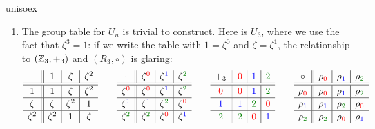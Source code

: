 \begin{examples}{}{unisoex}
\begin{enumerate}
  
  \item\label{ex:unisoex2} The group table for $U_n$ is trivial to construct. Here is $U_3$, where we use the fact that $\zeta^3=1$: if we write the table with $1=\zeta^0$ and $\zeta=\zeta^1$, the relationship to $(\mathbb{Z}_3,+_3)$ and $(R_3,\circ)$ is glaring:
\[\def\arraystretch{1.1}
\begin{array}{c||c|c|c}
\cdot&1&\zeta&\zeta^2\\\hline\hline
1&1&\zeta&\zeta^2\\\hline
\zeta&\zeta&\zeta^2&1\\\hline
\zeta^2&\zeta^2&1&\zeta
\end{array}
\qquad
\begin{array}{c||c|c|c}
\cdot&\zeta^{\textcolor{red}{0}}&\zeta^{\textcolor{blue}{1}}&\zeta^{\textcolor{Green}{2}}\\\hline\hline
\zeta^{\textcolor{red}{0}}&\zeta^{\textcolor{red}{0}}&\zeta^{\textcolor{blue}{1}}&\zeta^{\textcolor{Green}{2}}\\\hline
\zeta^{\textcolor{blue}{1}}&\zeta^{\textcolor{blue}{1}}&\zeta^{\textcolor{Green}{2}}&\zeta^{\textcolor{red}{0}}\\\hline
\zeta^{\textcolor{Green}{2}}&\zeta^{\textcolor{Green}{2}}&\zeta^{\textcolor{red}{0}}&\zeta^{\textcolor{blue}{1}}
\end{array}
\qquad
\begin{array}{c||c|c|c}
+_3&\textcolor{red}{0}&\textcolor{blue}{1}&\textcolor{Green}{2}\\\hline\hline
\textcolor{red}{0}&\textcolor{red}{0}&\textcolor{blue}{1}&\textcolor{Green}{2}\\\hline
\textcolor{blue}{1}&\textcolor{blue}{1}&\textcolor{Green}{2}&\textcolor{red}{0}\\\hline
\textcolor{Green}{2}&\textcolor{Green}{2}&\textcolor{red}{0}&\textcolor{blue}{1}
\end{array}
\qquad
\begin{array}{c||c|c|c}
\circ&\rho_{\textcolor{red}{0}}&\rho_{\textcolor{blue}{1}}&\rho_{\textcolor{Green}{2}}\\\hline\hline
\rho_{\textcolor{red}{0}}&\rho_{\textcolor{red}{0}}&\rho_{\textcolor{blue}{1}}&\rho_{\textcolor{Green}{2}}\\\hline
\rho_{\textcolor{blue}{1}}&\rho_{\textcolor{blue}{1}}&\rho_{\textcolor{Green}{2}}&\rho_{\textcolor{red}{0}}\\\hline
\rho_{\textcolor{Green}{2}}&\rho_{\textcolor{Green}{2}}&\rho_{\textcolor{red}{0}}&\rho_{\textcolor{blue}{1}}
\end{array}
\]
\end{enumerate}
\end{examples}
